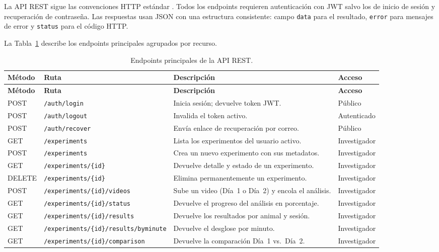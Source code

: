 La API REST sigue las convenciones HTTP estándar \cite{grinberg2018}. Todos los
endpoints requieren autenticación con JWT salvo los de inicio de sesión y recuperación
de contraseña. Las respuestas usan JSON con una estructura consistente: campo
\texttt{data} para el resultado, \texttt{error} para mensajes de error y
\texttt{status} para el código HTTP.

La Tabla~\ref{tab:api} describe los endpoints principales agrupados por recurso.

\begin{longtable}{|p{1.5cm}|p{4.0cm}|p{4.0cm}|p{3.5cm}|}
\caption{Endpoints principales de la API REST.
\label{tab:api}}\\
\hline
\textbf{Método} & \textbf{Ruta} & \textbf{Descripción} & \textbf{Acceso} \\
\hline
\endfirsthead
\hline
\textbf{Método} & \textbf{Ruta} & \textbf{Descripción} & \textbf{Acceso} \\
\hline
\endhead
\hline
\endfoot

POST & \texttt{/auth/login} & Inicia sesión; devuelve token JWT. & Público \\
\hline
POST & \texttt{/auth/logout} & Invalida el token activo. & Autenticado \\
\hline
POST & \texttt{/auth/recover} & Envía enlace de recuperación por correo. & Público \\
\hline

GET  & \texttt{/experiments} & Lista los experimentos del usuario activo. & Investigador \\
\hline
POST & \texttt{/experiments} & Crea un nuevo experimento con sus metadatos. & Investigador \\
\hline
GET  & \texttt{/experiments/\{id\}} & Devuelve detalle y estado de un experimento. & Investigador \\
\hline
DELETE & \texttt{/experiments/\{id\}} & Elimina permanentemente un experimento. & Investigador \\
\hline

POST & \texttt{/experiments/\{id\}/videos} & Sube un video (Día~1 o Día~2) y encola el análisis. & Investigador \\
\hline
GET  & \texttt{/experiments/\{id\}/status} & Devuelve el progreso del análisis en porcentaje. & Investigador \\
\hline

GET  & \texttt{/experiments/\{id\}/results} & Devuelve los resultados por animal y sesión. & Investigador \\
\hline
GET  & \texttt{/experiments/\{id\}/results/byminute} & Devuelve el desglose por minuto. & Investigador \\
\hline
GET  & \texttt{/experiments/\{id\}/comparison} & Devuelve la comparación Día~1 vs.\ Día~2. & Investigador \\
\hline


\end{longtable}
